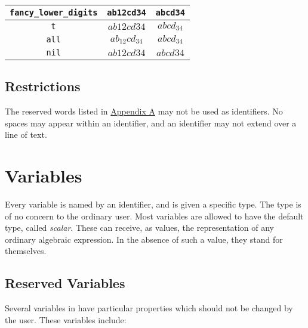 \begin{center}
  \begin{tabular}{c|cc}
    \texttt{fancy\_lower\_digits} & \texttt{ab12cd34} & \texttt{abcd34} \\
    \hline
    \texttt{t} & \(ab12cd34\) & \(abcd_{34}\) \\
    \texttt{all} & \(ab_{12}cd_{34}\) & \(abcd_{34}\) \\
    \texttt{nil} & \(ab12cd34\) & \(abcd34\)
  \end{tabular}
\end{center}

\subsection*{Restrictions}

The reserved words listed in \hyperlink{sec:appendixa}{Appendix A} may
not be used as identifiers.  No spaces may appear within an
identifier, and an identifier may not extend over a line of text.


\section{Variables}

Every variable is named by an identifier, and is given a
specific type.  The type is of no concern to the ordinary user.  Most
variables are allowed to have the default type, called
\emph{scalar}.
These can receive, as values, the representation of any ordinary algebraic
expression.  In the absence of such a value, they stand for themselves.

\subsection*{Reserved Variables}
\hypertarget{reserved:E}{}
\hypertarget{reserved:I}{}
\hypertarget{reserved:INFINITY}{}
\hypertarget{reserved:NIL}{}
\hypertarget{reserved:PI}{}
\hypertarget{reserved:T}{}
\hypertarget{reserved:K!*}{}
\hypertarget{reserved:EULER_GAMMA}{}
\hypertarget{reserved:GOLDEN_RATIO}{}
\hypertarget{reserved:CATALAN}{}
\hypertarget{reserved:KHINCHIN}{}
\hypertarget{reserved:NEGATIVE}{}
\hypertarget{reserved:POSITIVE}{}

Several variables in {\REDUCE} have particular
properties which should not be changed by the user.  These variables
include:

